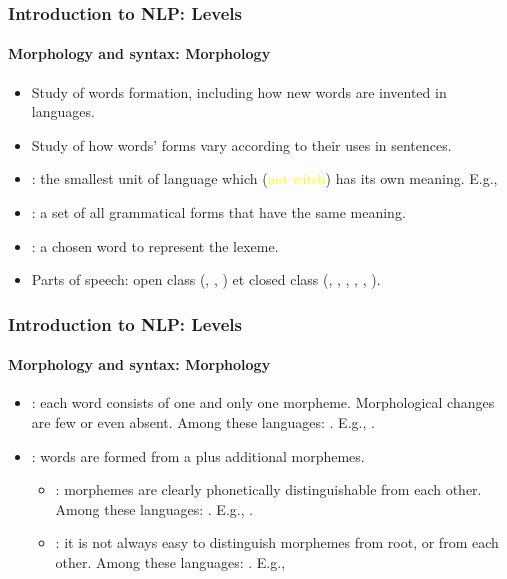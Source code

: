 \documentclass[xcolor=table]{beamer}
\begin{document}
\begin{frame}
\frametitle{Introduction to NLP: Levels}
\framesubtitle{Morphology and syntax: Morphology}

\begin{itemize}
	\item Study of words formation, including how new words are invented in languages.
	\item Study of how words' forms vary according to their uses in sentences.
	\item {}: the smallest unit of language which (\textcolor{yellow}{not witch}) has its own meaning. 
	E.g., 
	\item {}: a set of all grammatical forms that have the same meaning.
	\item {}: a chosen word to represent the lexeme.
	\item Parts of speech: open class (, , ) et closed class (, , , ,  , ).
\end{itemize}

\end{frame}


\begin{frame}
\frametitle{Introduction to NLP: Levels}
\framesubtitle{Morphology and syntax: Morphology}


\begin{itemize}
	\item {}: each word consists of one and only one morpheme. 
	Morphological changes are few or even absent.
	Among these languages: . 
	E.g., .
	\item {}: words are formed from a  plus additional morphemes.
	\begin{itemize}
		\item {}: morphemes are clearly phonetically distinguishable from each other.
		Among these languages: . 
		E.g., .
		\item {}: it is not always easy to distinguish morphemes from root, or from each other.
		Among these languages: .
		E.g., 
	\end{itemize}
\end{itemize}

\end{frame}
\end{document}
